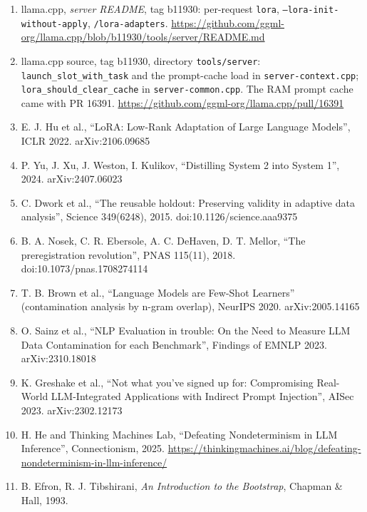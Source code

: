 \documentclass[11pt,a4paper]{article}
\newcommand{\code}[1]{\texttt{#1}}
\begin{document}
\begin{enumerate}
\item llama.cpp, \emph{server README}, tag b11930: per-request \code{lora}, \code{--lora-init-without-apply}, \code{/lora-adapters}. \url{https://github.com/ggml-org/llama.cpp/blob/b11930/tools/server/README.md}
\item llama.cpp source, tag b11930, directory \code{tools/server}: \code{launch\_slot\_with\_task} and the prompt-cache load in \code{server-context.cpp}; \code{lora\_should\_clear\_cache} in \code{server-common.cpp}. The RAM prompt cache came with PR 16391. \url{https://github.com/ggml-org/llama.cpp/pull/16391}
\item E. J. Hu et al., ``LoRA: Low-Rank Adaptation of Large Language Models'', ICLR 2022. arXiv:2106.09685
\item P. Yu, J. Xu, J. Weston, I. Kulikov, ``Distilling System 2 into System 1'', 2024. arXiv:2407.06023
\item C. Dwork et al., ``The reusable holdout: Preserving validity in adaptive data analysis'', Science 349(6248), 2015. doi:10.1126/science.aaa9375
\item B. A. Nosek, C. R. Ebersole, A. C. DeHaven, D. T. Mellor, ``The preregistration revolution'', PNAS 115(11), 2018. doi:10.1073/pnas.1708274114
\item T. B. Brown et al., ``Language Models are Few-Shot Learners'' (contamination analysis by n-gram overlap), NeurIPS 2020. arXiv:2005.14165
\item O. Sainz et al., ``NLP Evaluation in trouble: On the Need to Measure LLM Data Contamination for each Benchmark'', Findings of EMNLP 2023. arXiv:2310.18018
\item K. Greshake et al., ``Not what you've signed up for: Compromising Real-World LLM-Integrated Applications with Indirect Prompt Injection'', AISec 2023. arXiv:2302.12173
\item H. He and Thinking Machines Lab, ``Defeating Nondeterminism in LLM Inference'', Connectionism, 2025. \url{https://thinkingmachines.ai/blog/defeating-nondeterminism-in-llm-inference/}
\item B. Efron, R. J. Tibshirani, \emph{An Introduction to the Bootstrap}, Chapman \& Hall, 1993.
\end{enumerate}
\end{document}
